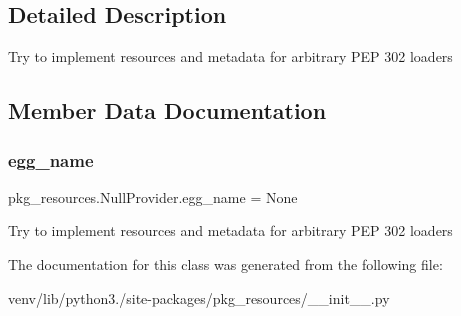 \subsection{Detailed Description}
\begin{DoxyVerb}Try to implement resources and metadata for arbitrary PEP 302 loaders\end{DoxyVerb}
 

\subsection{Member Data Documentation}
\mbox{\label{classpkg__resources_1_1_null_provider_a9f438778df10c5f6cf89c050381bb17b}} 
\subsubsection{\texorpdfstring{egg\+\_\+name}{egg\_name}}
{\footnotesize\ttfamily pkg\+\_\+resources.\+Null\+Provider.\+egg\+\_\+name = None\hspace{0.3cm}{\ttfamily [static]}}

\begin{DoxyVerb}Try to implement resources and metadata for arbitrary PEP 302 loaders\end{DoxyVerb}
 

The documentation for this class was generated from the following file\+:\begin{DoxyCompactItemize}
\item 
venv/lib/python3./site-\/packages/pkg\+\_\+resources/\+\_\+\+\_\+init\+\_\+\+\_\+.\+py\end{DoxyCompactItemize}
